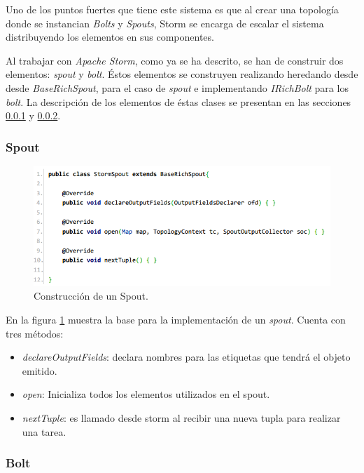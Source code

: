 	Uno de los puntos fuertes que tiene este sistema es que al crear una topología donde se instancian \textit{Bolts} y \textit{Spouts}, Storm se encarga de escalar el sistema distribuyendo los elementos en sus componentes.

	Al trabajar con \textit{Apache Storm}, como ya se ha descrito, se han de construir dos elementos: \textit{spout} y \textit{bolt}. Éstos elementos se construyen realizando heredando desde desde \textit{BaseRichSpout}, para el caso de \textit{spout} e implementando \textit{IRichBolt} para los \textit{bolt}. La descripción de los elementos de éstas clases se presentan en las secciones \ref{subsubsec:Spout} y \ref{subsubsec:Bolt}.

	\subsubsection{Spout}
	\label{subsubsec:Spout}

	\begin{figure}[H]
		\centering
		\captionsetup{justification=centering}
		\includegraphics[scale=0.8]{images/SpoutBase.png}
		\caption[Construcción de un Spout.]{Construcción de un Spout.}
		\label{fig:spoutbase}
	\end{figure}

	En la figura \ref{fig:spoutbase} muestra la base para la implementación de un \textit{spout}. Cuenta con tres métodos:

	\begin{itemize}
	\item \textit{declareOutputFields}: declara nombres para las etiquetas que tendrá el objeto emitido.
	\item \textit{open}: Inicializa todos los elementos utilizados en el spout.
	\item \textit{nextTuple}: es llamado desde storm al recibir una nueva tupla para realizar una tarea.
	\end{itemize}	

	\subsubsection{Bolt}
	\label{subsubsec:Bolt}

